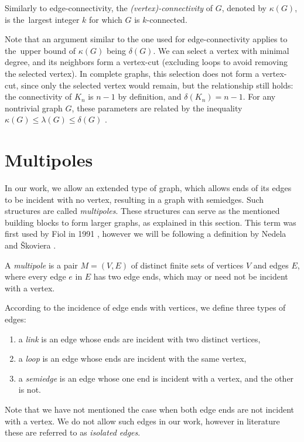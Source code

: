 \documentclass[12pt, twoside]{book}
\begin{document}
Similarly to edge-connectivity, the \textit{(vertex)-connectivity} of $G$, denoted by $\kappa(G)$, is the~largest integer $k$ for which $G$ is $k$-connected.

Note that an argument similar to the one used for edge-connectivity applies to the~upper bound of $\kappa(G)$ being $\delta(G)$. We can select a vertex with minimal degree, and its neighbors form a vertex-cut (excluding loops to avoid removing the selected vertex). In complete graphs, this selection does not form a vertex-cut, since only the selected vertex would remain, but the relationship still holds: the connectivity of $K_n$ is $n-1$ by definition, and $\delta(K_n)=n-1$. For any nontrivial graph $G$, these parameters are related by the inequality $\kappa(G)\leq \lambda(G) \leq \delta(G)$ \cite{Diestel}.

\section{Multipoles}\label{sec:multipoles}

In our work, we allow an extended type of graph, which allows ends of its edges to be incident with no vertex, resulting in a graph with semiedges. Such structures are called \textit{multipoles}. These structures can serve as the mentioned building blocks to form larger graphs, as explained in this section. This term was first used by Fiol in 1991 \cite{Fiol1991}, however we will be following a definition by Nedela and Škoviera \cite{Nedela1996}.

\begin{definition}
	A \textit{multipole} is a pair $M=(V,E)$ of distinct finite sets of vertices $V$ and edges $E$, where every edge $e$ in $E$ has two edge ends, which may or need not be incident with a vertex.
	
	According to the incidence of edge ends with vertices, we define three types of edges:
	\begin{enumerate}[nolistsep]
		\item a \textit{link} is an edge whose ends are incident with two distinct vertices,
		\item a \textit{loop} is an edge whose ends are incident with the same vertex,
		\item a \textit{semiedge} is an edge whose one end is incident with a vertex, and the other is not.
	\end{enumerate}
\end{definition}

Note that we have not mentioned the case when both edge ends are not incident with a vertex. We do not allow such edges in our work, however in literature these are referred to as \textit{isolated edges}.
\end{document}
